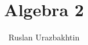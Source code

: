 \documentclass[11pt, a4paper]{article}
\begin{document}
\title{Algebra 2}
\author{Ruslan Urazbakhtin}
\maketitle

\newpage
\tableofcontents
\newpage



\newpage


\newpage


% 
\end{document}
